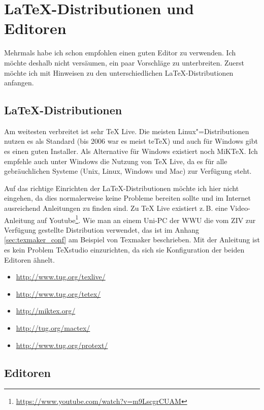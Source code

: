 \chapter{\LaTeX-Distributionen und Editoren}

Mehrmals habe ich schon empfohlen einen guten Editor zu verwenden. Ich möchte deshalb nicht versäumen, ein paar Vorschläge zu unterbreiten. Zuerst möchte ich mit Hinweisen zu den unterschiedlichen \LaTeX-Distributionen anfangen.

\section{\LaTeX-Distributionen}

Am weitesten verbreitet ist sehr TeX Live. Die meisten Linux"=Distributionen nutzen es als Standard (bis 2006 war es meist teTeX) und auch für Windows gibt es einen guten Installer. Als Alternative für Windows existiert noch MiKTeX. Ich empfehle auch unter Windows die Nutzung von TeX Live, da es für alle gebräuchlichen Systeme (Unix, Linux, Windows und Mac) zur Verfügung steht.

Auf das richtige Einrichten der \LaTeX-Distributionen möchte ich hier nicht eingehen, da dies normalerweise keine Probleme bereiten sollte und im Internet ausreichend Anleitungen zu finden sind. Zu TeX Live existiert z.\,B. eine Video-Anleitung auf Youtube\footnote{\url{https://www.youtube.com/watch?v=m9LscgrCUAM}}. Wie man an einem Uni-PC der WWU die vom ZIV zur Verfügung gestellte Distribution verwendet, das ist im Anhang \ref{sec:texmaker_conf} am Beispiel von Texmaker beschrieben. Mit der Anleitung ist es kein Problem TeXstudio einzurichten, da sich sie Konfiguration der beiden Editoren ähnelt.

\begin{itemize}
    \item \url{http://www.tug.org/texlive/}
    \item \url{http://www.tug.org/tetex/}
    \item \url{http://miktex.org/}
    \item \url{http://tug.org/mactex/}
    \item \url{http://www.tug.org/protext/}
\end{itemize}

\section{Editoren}
\label{sec:editoren}

